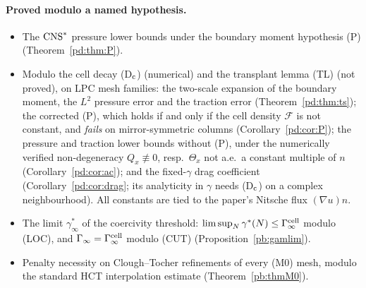 \paragraph{Proved modulo a named hypothesis.}
\begin{itemize}
\item The $\mathrm{CNS}^\ast$ pressure lower bounds under the boundary moment hypothesis (P) (Theorem~\ref{pd:thm:P}).
\item Modulo the cell decay (D$_{\rm c}$) (numerical) and the transplant lemma (TL) (not proved), on LPC mesh families: the two-scale expansion of the boundary moment, the $L^2$ pressure error and the traction error (Theorem~\ref{pd:thm:ts}); the corrected (P), which holds if and only if the cell density $\mathcal F$ is not constant, and \emph{fails} on mirror-symmetric columns (Corollary~\ref{pd:cor:P}); the pressure and traction lower bounds without (P), under the numerically verified non-degeneracy $Q_x\not\equiv0$, resp.\ $\Theta_x$ not a.e.\ a constant multiple of $n$ (Corollary~\ref{pd:cor:ac}); and the fixed-$\gamma$ drag coefficient (Corollary~\ref{pd:cor:drag}; its analyticity in $\gamma$ needs (D$_{\rm c}$) on a complex neighbourhood). All constants are tied to the paper's Nitsche flux $(\nabla u)n$.
\item The limit $\gamma^\ast_\infty$ of the coercivity threshold: $\limsup_N\gamma^\ast(N)\le\Gamma^{\rm cell}_\infty$ modulo (LOC), and $\Gamma_\infty=\Gamma^{\rm cell}_\infty$ modulo (CUT) (Proposition~\ref{pb:gamlim}).
\item Penalty necessity on Clough--Tocher refinements of every (M0) mesh, modulo the standard HCT interpolation estimate (Theorem~\ref{pb:thmM0}).
\end{itemize}

